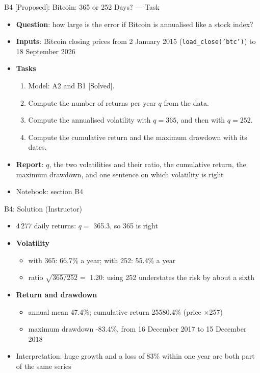\begin{frame}{B4 [Proposed]: Bitcoin: 365 or 252 Days? --- Task}
\itemsize{\small}
\begin{itemize}
\item \textbf{Question}: how large is the error if Bitcoin is annualised like a stock index?
\item \textbf{Inputs}: Bitcoin closing prices from 2 January 2015 (\texttt{load\_close('btc')}) to 18 September 2026
\item \textbf{Tasks}
\begin{enumerate}
    \item Model: A2 and B1 [Solved].
    \item Compute the number of returns per year $q$ from the data.
    \item Compute the annualised volatility with $q = 365$, and then with $q = 252$.
    \item Compute the cumulative return and the maximum drawdown with its dates.
\end{enumerate}
\item \textbf{Report}: $q$, the two volatilities and their ratio, the cumulative return, the maximum drawdown, and one sentence on which volatility is right
\item Notebook: section B4
\end{itemize}
\end{frame}

\ifsolutions
\begin{frame}{B4: Solution (Instructor)}
\itemsize{\small}
\begin{itemize}
    \item 4\,277 daily returns: $q = $ 365.3, so 365 is right
    \item \textbf{Volatility}
    \begin{itemize}
        \item with 365: 66.7\% a year; with 252: 55.4\% a year
        \item ratio $\sqrt{365/252} = $ 1.20: using 252 understates the risk by about a sixth
    \end{itemize}
    \item \textbf{Return and drawdown}
    \begin{itemize}
        \item annual mean 47.4\%; cumulative return 25580.4\% (price $\times$257)
        \item maximum drawdown -83.4\%, from 16 December 2017 to 15 December 2018
    \end{itemize}
    \item Interpretation: huge growth and a loss of 83\% within one year are both part of the same series
\end{itemize}
\end{frame}
\fi


